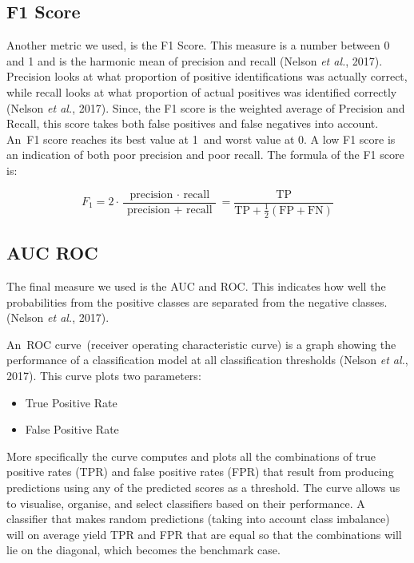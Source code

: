 \subsection{F1 Score}
Another metric we used, is the F1 Score. This measure is a number between 0 and 1 and is the harmonic mean of precision and recall (Nelson \textit{et al.}, 2017). Precision looks at what proportion of positive identifications was actually correct, while recall looks at what proportion of actual positives was identified correctly (Nelson \textit{et al.}, 2017). Since, the F1 score is the weighted average of Precision and Recall, this score takes both false positives and false negatives into account. An F1 score reaches its best value at 1 and worst value at 0. A low F1 score is an indication of both poor precision and poor recall. The formula of the F1 score is:

\begin{equation}
F_{1}=2 \cdot \frac{\text { precision } \cdot \text { recall }}{\text { precision }+\text { recall }}=\frac{\mathrm{TP}}{\mathrm{TP}+\frac{1}{2}(\mathrm{FP}+\mathrm{FN})}
\end{equation}

\subsection{AUC ROC}

The final measure we used is the AUC and ROC. This indicates how well the probabilities from the positive classes are separated from the negative classes. (Nelson \textit{et al.}, 2017). 

An ROC curve (receiver operating characteristic curve) is a graph showing the performance of a classification model at all classification thresholds (Nelson \textit{et al.}, 2017). This curve plots two parameters:
\begin{itemize}
\item True Positive Rate
\item False Positive Rate
\end{itemize}

More specifically the curve computes and plots all the combinations of true positive rates (TPR) and false positive rates (FPR) that result from producing predictions using any of the predicted scores as a threshold. The curve allows us to visualise, organise, and select classifiers based on their performance. A classifier that makes random predictions (taking into account class imbalance) will on average yield TPR and FPR that are equal so that the combinations will lie on the diagonal, which becomes the benchmark case.

